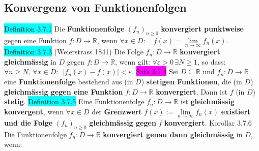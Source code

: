 \documentclass[landscape, 10pt]{article}
\newcommand{\R}{\mathbb{R}}
\begin{document}
\begin{multicols}{3}
       \subsection{Konvergenz von Funktionenfolgen}
              \colorbox{cyan}{Definition 3.7.1} Die \textbf{Funktionenfolge} 
                     \textcolor{NavyBlue}{$(f_n)_{n\geqslant0}$}
                     \textbf{konvergiert punktweise} gegen eine Funktion
                     \textcolor{NavyBlue}{$f:D\longrightarrow\R$}, wenn 
                     \textcolor{NavyBlue}{
                     $\forall x\in D:\quad f(x)=\lim\limits_{n\to\infty}f_n(x)$}.
              \colorbox{cyan}{Definition 3.7.3} (Weierstrass 1841) Die Folge 
                     \textcolor{NavyBlue}{$f_n:D\longrightarrow\R$} 
                     \textbf{konvergiert gleichmässig} in 
                     \textcolor{NavyBlue}{$D$} gegen 
                     \textcolor{NavyBlue}{$f:D\longrightarrow\R$}, 
                     wenn gilt: 
                     \textcolor{NavyBlue}{$\forall\varepsilon>0\,\exists N\geqslant1$}, 
                     so dass: \textcolor{NavyBlue}{
                     $\forall n\geqslant N,\,\forall x\in D:\enspace |f_n(x)-f(x)|<\varepsilon$}.
              \colorbox{magenta}{Satz 3.7.4} Sei \textcolor{NavyBlue}{$D\subseteq\R$} und 
                     \textcolor{NavyBlue}{$f_n:D\longrightarrow\R$} 
                     eine \textbf{Funktionenfolge} bestehend aus 
                     (in $D$) \textbf{stetigen Funktionen}, die 
                     (in $D$) \textbf{gleichmässig gegen eine 
                     Funktion} \textcolor{NavyBlue}{$f:D\longrightarrow\R$} 
                     \textbf{konvergiert}. 
                     Dann ist \textcolor{NavyBlue}{$f$} (in $D$) \textbf{stetig}.
              \colorbox{cyan}{Definition 3.7.5} Eine Funktionenfolge 
                     \textcolor{NavyBlue}{$f_n:D\longrightarrow\R$}
                     ist \textbf{gleichmässig konvergent}, wenn 
                     \textcolor{NavyBlue}{$\forall x\in D$} der 
                     \textbf{Grenzwert} 
                     \textcolor{NavyBlue}{$f(x):=\lim\limits_{n\to\infty}f_n(x)$}
                     \textbf{existiert und die Folge}
                     \textcolor{NavyBlue}{$(f_n)_{n\geqslant0}$} 
                     \textbf{gleichmässig gegen} \textcolor{NavyBlue}{$f$} 
                     \textbf{konvergiert}.
              \colorbox{BurntOrange}{Korollar 3.7.6} Die Funktionenfolge 
                     \textcolor{NavyBlue}{$f_n:D\longrightarrow\R$}
                     \textbf{konvergiert genau dann gleichmässig} in $D$, wenn: 

\end{multicols}
\end{document}
